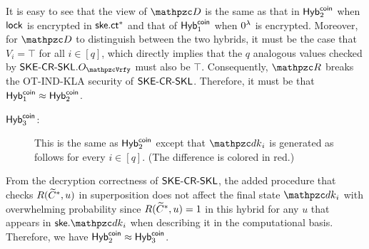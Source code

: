 It is easy to see that the view of $\qD$ is the same as that in
$\mathsf{Hyb}^{\mathsf{coin}}_2$ when $\mathsf{lock}$ is encrypted in $\mathsf{ske}.\mathsf{ct}^*$ and that of
$\mathsf{Hyb}^{\mathsf{coin}}_1$ when $0^\lambda$ is encrypted. Moreover, for $\qD$ to
distinguish between the two hybrids, it must be the case that $V_i =
\top$ for all $i \in [q]$, which directly implies that the $q$
analogous values checked by $\SKECRSKL.\Oracle{\qVrfy}$ must also be
$\top$.  Consequently, $\qR$ breaks the OT-IND-KLA security of
$\mathsf{SKE}\textrm{-}\mathsf{CR}\textrm{-}\mathsf{SKL}$. Therefore, it must be that $\mathsf{Hyb}_1^{\mathsf{coin}} \approx
\mathsf{Hyb}_2^{\mathsf{coin}}$.

\begin{description}
\item[$\mathsf{Hyb}_{3}^{\mathsf{coin}}$:]This is the same as $\mathsf{Hyb}_{2}^{\mathsf{coin}}$ except
that $\qdk_i$ is generated as follows for every $i\in[q]$. (The
difference is colored in red.)
\end{description}

From the decryption correctness of $\mathsf{SKE}\textrm{-}\mathsf{CR}\textrm{-}\mathsf{SKL}$, the added procedure that checks $R(\widetilde{C}^*,u)$ in superposition does not affect the final state $\qdk_i$ with overwhelming probability since $R(\widetilde{C}^*,u)=1$ in this hybrid for any $u$ that appears in $\ske.\qdk_i$ when describing it in the computational basis.
Therefore, we have $\mathsf{Hyb}_2^{\mathsf{coin}} \approx \mathsf{Hyb}_3^{\mathsf{coin}}$.

